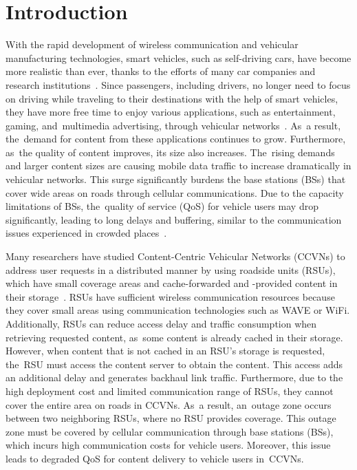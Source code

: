 \documentclass[electronics,aricle,accept,pdftex,moreauthors]{Definitions/mdpi}
\begin{document}
\section{Introduction}
With the rapid development of wireless communication and vehicular manufacturing technologies, smart vehicles, such as self-driving cars, have become more realistic than ever, thanks to the efforts of many car companies and research institutions~\cite{Zhe2020}. Since passengers, including drivers, no longer need to focus on driving while traveling to their destinations with the help of smart vehicles, they have more free time to enjoy various applications, such as entertainment, gaming, and~multimedia advertising, through vehicular networks~\cite{Shahwani2022}. As~a result, the~demand for content from these applications continues to grow. Furthermore, as~the quality of content improves, its size also increases. The~rising demands and larger content sizes are causing mobile data traffic to increase dramatically in vehicular networks. This surge significantly burdens the base stations (BSs) that cover wide areas on roads through cellular communications. Due to the capacity limitations of BSs, the~quality of service (QoS) for vehicle users may drop significantly, leading to long delays and buffering, similar to the communication issues experienced in crowded places~\cite{Liu2019}.

Many researchers have studied Content-Centric Vehicular Networks (CCVNs) to address user requests in a distributed manner by using roadside units (RSUs), which have small coverage areas and cache-forwarded and -provided content in their storage~\cite{Lee2014, Su2017, Wang2019, Elsayed2022, AlNagar2022, Bouk2015C}.
RSUs have sufficient wireless communication resources because they cover small areas using communication technologies such as WAVE or WiFi. Additionally, RSUs can reduce access delay and traffic consumption when retrieving requested content, as~some content is already cached in their storage. However, when content that is not cached in an RSU's storage is requested, the~RSU must access the content server to obtain the content. This access adds an additional delay and generates backhaul link traffic. Furthermore, due to the high deployment cost and limited communication range of RSUs, they cannot cover the entire area on roads in CCVNs. As~a result, an~outage zone occurs between two neighboring RSUs, where no RSU provides coverage. This outage zone must be covered by cellular communication through base stations (BSs), which incurs high communication costs for vehicle users. Moreover, this issue leads to degraded QoS for content delivery to vehicle users in~CCVNs.
\end{document}
